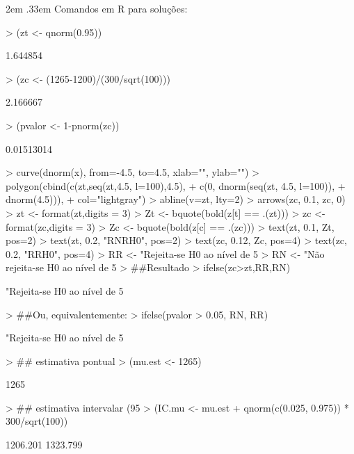 \documentclass{article}
\newenvironment{ManualExercise}
  {\begin{list}{}{\leftmargin \QuestionIndent
    \partopsep0pt \parsep\parskip \topsep\QuestionBefore
    \itemsep\QuestionBefore \labelwidth2em
    \labelsep.33em
    \usecounter{Question}}}
  {\end{list}}
\begin{document}
\begin{Exercise}
\begin{ManualExercise}
Comandos em R para soluções:

\begin{Schunk}
\begin{Sinput}
> (zt <- qnorm(0.95))
\end{Sinput}
\begin{Soutput}
[1] 1.644854
\end{Soutput}
\begin{Sinput}
> (zc <- (1265-1200)/(300/sqrt(100)))
\end{Sinput}
\begin{Soutput}
[1] 2.166667
\end{Soutput}
\begin{Sinput}
> (pvalor <- 1-pnorm(zc))
\end{Sinput}
\begin{Soutput}
[1] 0.01513014
\end{Soutput}
\begin{Sinput}
> curve(dnorm(x), from=-4.5, to=4.5, xlab="", ylab="")
> polygon(cbind(c(zt,seq(zt,4.5, l=100),4.5), 
+               c(0, dnorm(seq(zt, 4.5, l=100)), 
+                 dnorm(4.5))), 
+         col="lightgray")
> abline(v=zt, lty=2)
> arrows(zc, 0.1, zc, 0)
> zt <- format(zt,digits = 3)
> Zt <- bquote(bold(z[t] == .(zt)))
> zc <- format(zc,digits = 3)
> Zc <- bquote(bold(z[c] == .(zc)))
> text(zt, 0.1, Zt, pos=2)
> text(zt, 0.2, "RNRH0", pos=2)
> text(zc, 0.12, Zc, pos=4)
> text(zc, 0.2, "RRH0", pos=4)
> RR <- "Rejeita-se H0 ao nível de 5%
> RN <- "Não rejeita-se H0 ao nível de 5%
> ##Resultado
> ifelse(zc>zt,RR,RN)
\end{Sinput}
\begin{Soutput}
[1] "Rejeita-se H0 ao nível de 5%
\end{Soutput}
\begin{Sinput}
> ##Ou, equivalentemente:
> ifelse(pvalor > 0.05, RN, RR)
\end{Sinput}
\begin{Soutput}
[1] "Rejeita-se H0 ao nível de 5%
\end{Soutput}
\begin{Sinput}
> ## estimativa pontual
> (mu.est <- 1265)
\end{Sinput}
\begin{Soutput}
[1] 1265
\end{Soutput}
\begin{Sinput}
> ## estimativa intervalar (95%
> (IC.mu <- mu.est + qnorm(c(0.025, 0.975)) * 300/sqrt(100))
\end{Sinput}
\begin{Soutput}
[1] 1206.201 1323.799
\end{Soutput}
\end{Schunk}


\end{ManualExercise}
\end{Exercise}
\end{document}
